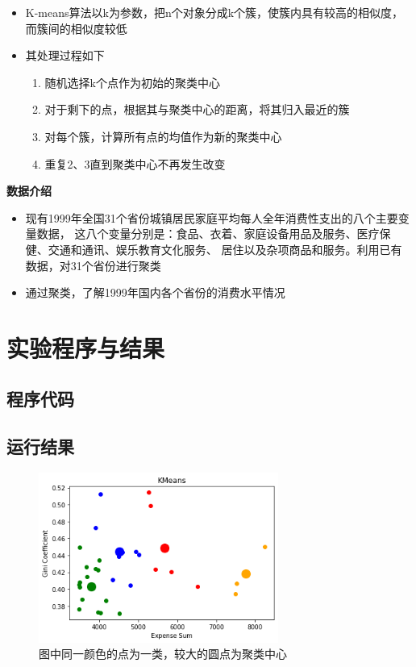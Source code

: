 \documentclass[a4paper]{ctexart}
\begin{document}
  \begin{itemize}
    \item K-means算法以k为参数，把n个对象分成k个簇，使簇内具有较高的相似度，而簇间的相似度较低
    \item 其处理过程如下
    \begin{enumerate}
      \item 随机选择k个点作为初始的聚类中心
      \item 对于剩下的点，根据其与聚类中心的距离，将其归入最近的簇
      \item 对每个簇，计算所有点的均值作为新的聚类中心
      \item 重复2、3直到聚类中心不再发生改变
    \end{enumerate}
  \end{itemize}
  \textbf{数据介绍}
  \begin{itemize}
    \item 现有1999年全国31个省份城镇居民家庭平均每人全年消费性支出的八个主要变量数据，
    这八个变量分别是：食品、衣着、家庭设备用品及服务、医疗保健、交通和通讯、娱乐教育文化服务、
    居住以及杂项商品和服务。利用已有数据，对31个省份进行聚类
    \item 通过聚类，了解1999年国内各个省份的消费水平情况
  \end{itemize}

  \section{实验程序与结果}
  \subsection{程序代码}
  
  \subsection{运行结果}
  \begin{figure}[H]
    \centering
    \includegraphics[width=0.7\textwidth]{fig/output.png}
    \caption{图中同一颜色的点为一类，较大的圆点为聚类中心}
  \end{figure}
\end{document}
